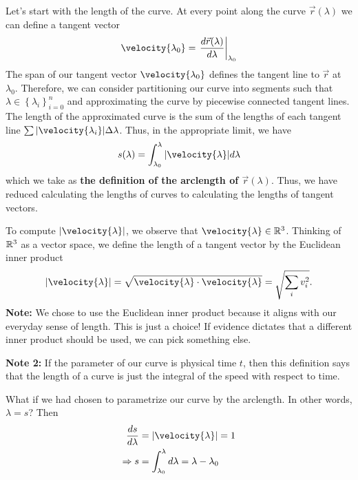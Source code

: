 Let's start with the length of the curve. At every point along the curve
$\vec{r}(\lambda)$ we can define a tangent vector
\begin{equation}
  \velocity{\lambda_0} = \left.\frac{d\vec{r}(\lambda)}{d\lambda}\right|_{\lambda_0}
\end{equation}
The span of our tangent vector $\velocity{\lambda_0}$ defines the tangent line
to $\vec{r}$ at $\lambda_0$. Therefore, we can consider partitioning our curve
into segments such that $\lambda\in \left\{\lambda_i\right\}_{i=0}^{n}$ and
approximating the curve by piecewise connected tangent lines. The length of the
approximated curve is the sum of the lengths of each tangent line
$\sum|\velocity{\lambda_i}|\Delta \lambda$. Thus, in the appropriate limit, we have
\begin{equation}
  s(\lambda) = \int_{\lambda_0}^{\lambda}|\velocity{\lambda}|d\lambda
\end{equation}
which we take as \textbf{the definition of the arclength of $\vec{r}(\lambda)$}.
Thus, we have reduced calculating the lengths of curves to calculating the
lengths of tangent vectors. 

To compute $|\velocity{\lambda}|$, we observe that $\velocity{\lambda}\in\R^3$.
Thinking of $\mathbb{R}^3$ as a vector space, we define the length of a tangent
vector by the Euclidean inner product
\begin{equation}
  |\velocity{\lambda}| = \sqrt{\velocity{\lambda}\cdot\velocity{\lambda}} = \sqrt{\sum_i v_i^2}.
\end{equation}
\textbf{Note:} We chose to use the Euclidean inner product because it aligns
with our everyday sense of length. This is just a choice! If evidence dictates
that a different inner product should be used, we can pick something else.

\textbf{Note 2:} If the parameter of our curve is physical time $t$, then this definition says
that the length of a curve is just the integral of the speed with respect to
time.

What if we had chosen to parametrize our curve by the arclength. In other words,
$\lambda = s$? Then
\begin{align}
  \frac{ds}{d\lambda} &= |\velocity{\lambda}| = 1  \\
  \Rightarrow s &= \int_{\lambda_0}^{\lambda}d\lambda = \lambda-\lambda_0
\end{align}
































